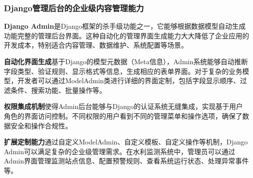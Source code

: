 \subsubsection{Django管理后台的企业级内容管理能力}\label{djangoux7ba1ux7406ux540eux53f0ux7684ux4f01ux4e1aux7ea7ux5185ux5bb9ux7ba1ux7406ux80fdux529b}

\textbf{Django Admin}是Django框架的杀手级功能之一，它能够根据数据模型自动生成功能完整的管理后台界面。这种自动化的管理界面生成能力大大降低了企业应用的开发成本，特别适合内容管理、数据维护、系统配置等场景。

\textbf{自动化界面生成}基于Django的模型元数据（Meta信息），Admin系统能够自动推断字段类型、验证规则、显示格式等信息，生成相应的表单界面。对于复杂的业务模型，开发者可以通过ModelAdmin类进行详细的界面定制，包括字段显示顺序、过滤条件、搜索功能、批量操作等。

\textbf{权限集成机制}使得Admin后台能够与Django的认证系统无缝集成，实现基于用户角色的界面访问控制。不同权限的用户看到不同的管理菜单和操作选项，确保了数据安全和操作合规性。

\textbf{扩展定制能力}通过自定义ModelAdmin、自定义模板、自定义操作等机制，Django Admin可以满足复杂的企业级管理需求。在水利监测系统中，管理员可以通过Admin界面管理监测站点信息、配置预警规则、查看系统运行状态、处理异常事件等。

